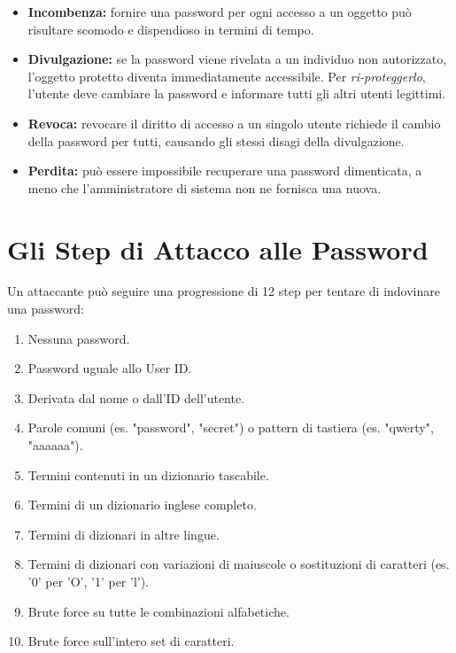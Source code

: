 \documentclass{article}
\begin{document}
\begin{itemize}
    \item \textbf{Incombenza:} fornire una password per ogni accesso a un oggetto può risultare scomodo e dispendioso in termini di tempo.
    \item \textbf{Divulgazione:} se la password viene rivelata a un individuo non autorizzato, l'oggetto protetto diventa immediatamente accessibile. Per \textit{ri-proteggerlo}, l'utente deve cambiare la password e informare tutti gli altri utenti legittimi.
    \item \textbf{Revoca:} revocare il diritto di accesso a un singolo utente richiede il cambio della password per tutti, causando gli stessi disagi della divulgazione.
    \item \textbf{Perdita:} può essere impossibile recuperare una password dimenticata, a meno che l'amministratore di sistema non ne fornisca una nuova.
\end{itemize}

\vspace{0.8cm}

\section*{Gli Step di Attacco alle Password}

Un attaccante può seguire una progressione di 12 step per tentare di indovinare una password:

\begin{enumerate}
    \item Nessuna password.
    \item Password uguale allo User ID.
    \item Derivata dal nome o dall'ID dell'utente.
    \item Parole comuni (es. "password", "secret") o pattern di tastiera (es. "qwerty", "aaaaaa").
    \item Termini contenuti in un dizionario tascabile.
    \item Termini di un dizionario inglese completo.
    \item Termini di dizionari in altre lingue.
    \item Termini di dizionari con variazioni di maiuscole o sostituzioni di caratteri (es. '0' per 'O', '1' per 'l').
    \item Brute force su tutte le combinazioni alfabetiche.
    \item Brute force sull'intero set di caratteri.
\end{enumerate}
\end{document}
